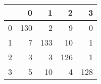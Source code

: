\begin{tabular}{lrrrr}
\toprule
{} &    0 &    1 &    2 &    3 \\
\midrule
0 &  130 &    2 &    9 &    0 \\
1 &    7 &  133 &   10 &    1 \\
2 &    3 &    3 &  126 &    1 \\
3 &    5 &   10 &    4 &  128 \\
\bottomrule
\end{tabular}
